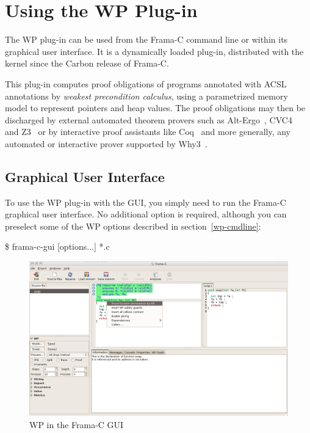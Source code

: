 \chapter{Using the WP Plug-in}
\label{wp-plugin}

The \textsf{WP} plug-in can be used from the \textsf{Frama-C} command line
or within its graphical user interface. It is a
dynamically loaded plug-in, distributed with the kernel since the
\textsf{Carbon} release of \textsf{Frama-C}.

This plug-in computes proof obligations of programs annotated with
\textsf{ACSL} annotations by \emph{weakest precondition calculus},
using a parametrized memory model to represent pointers and heap
values. The proof obligations may then be discharged by external
automated theorem provers such as
\textsf{Alt-Ergo}~\cite{AltErgo2006},
\textsf{CVC4}~\cite{CVC4} and
\textsf{Z3}~\cite{Z3}
or by interactive proof assistants
like \textsf{Coq}~\cite{Coq84} and more generally, any automated or interactive
prover supported by \textsf{Why3}~\cite{Why3}.

\clearpage
\section{Graphical User Interface}
\label{wp-gui}

\newcommand{\loadicon}[1]{\raisebox{-3pt}{\rule{0pt}{13pt}\texttt{[image: \#1]}}}

To use the \textsf{WP} plug-in with the GUI, you simply need to run the
\textsf{Frama-C} graphical user interface. No additional option is
required, although you can preselect some of the \textsf{WP} options
described in section~\ref{wp-cmdline}:

\begin{shell}
  \$ frama-c-gui [options...] *.c
\end{shell}

\begin{figure}[p]
\begin{center}
\includegraphics[width=\textwidth]{wp-gui-main.png}
\end{center}
\caption{\textsf{WP} in the Frama-C GUI}
\label{wp-gui-panel}
\end{figure}

